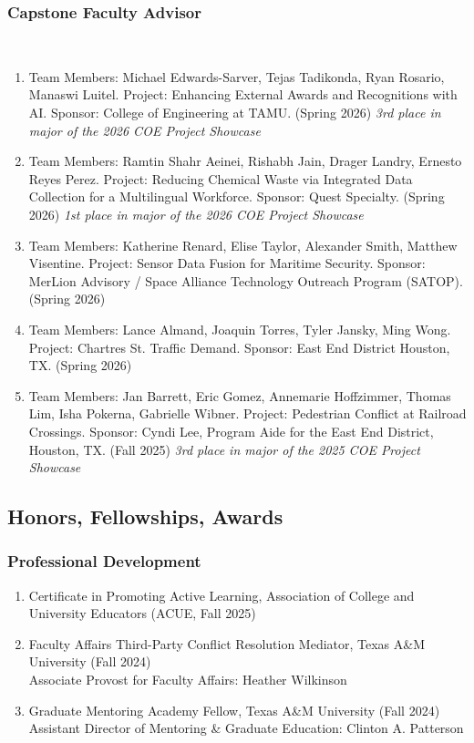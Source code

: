 \documentclass[11pt,oneside]{article}
\begin{document}
\subsubsection{Capstone Faculty Advisor}
\hspace{40pt}{\frutigerregular Industrial \& Systems Engineering, Texas A\&M University}\\
\begin{enumerate}[leftmargin=40pt]

\item Team Members: Michael Edwards-Sarver, Tejas Tadikonda, Ryan Rosario, Manaswi Luitel.
       Project: Enhancing External Awards and Recognitions with AI. Sponsor: College of Engineering at TAMU.
       (Spring 2026) \emph{3rd place in major of the 2026 COE Project Showcase}
\item Team Members: Ramtin Shahr Aeinei, Rishabh Jain, Drager Landry, Ernesto Reyes Perez.
       Project: Reducing Chemical Waste via Integrated Data Collection for a Multilingual Workforce. Sponsor: Quest Specialty.
       (Spring 2026) \emph{1st place in major of the 2026 COE Project Showcase}
\item Team Members: Katherine Renard, Elise Taylor, Alexander Smith, Matthew Visentine.
       Project: Sensor Data Fusion for Maritime Security. Sponsor: MerLion Advisory / Space Alliance Technology Outreach Program (SATOP).
       (Spring 2026)
\item Team Members: Lance Almand, Joaquin Torres, Tyler Jansky, Ming Wong.
       Project: Chartres St. Traffic Demand. Sponsor: East End District Houston, TX.
       (Spring 2026)
\item Team Members: Jan Barrett, Eric Gomez, Annemarie Hoffzimmer, Thomas Lim, Isha Pokerna, Gabrielle Wibner.
       Project: Pedestrian Conflict at Railroad Crossings. Sponsor: Cyndi Lee, Program Aide for the East End District, Houston, TX.
       (Fall 2025) \emph{3rd place in major of the 2025 COE Project Showcase}
\end{enumerate}

\subsection{Honors, Fellowships, Awards}

\subsubsection{Professional Development}
\begin{enumerate}[leftmargin=40pt]
\item {Certificate in Promoting Active Learning,} Association of College and University Educators (ACUE, Fall 2025)
\item Faculty Affairs Third-Party Conflict Resolution Mediator, Texas A\&M University (Fall 2024)\\
      Associate Provost for Faculty Affairs: Heather Wilkinson
\item Graduate Mentoring Academy Fellow, Texas A\&M University (Fall 2024)\\
      Assistant Director of Mentoring \& Graduate Education: Clinton A. Patterson
\end{enumerate}
\end{document}
